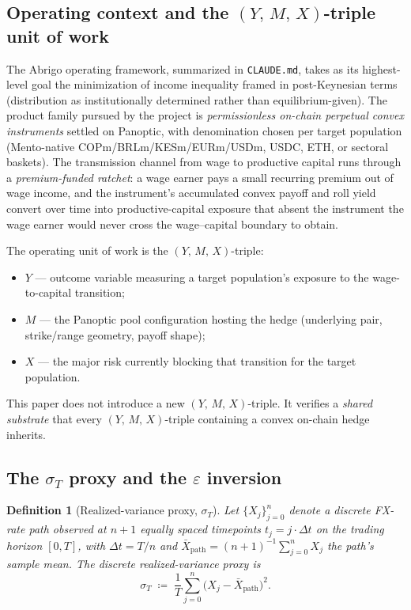 \documentclass[11pt,letterpaper]{article}
\newtheorem{definition}{Definition}[section]
\newcommand{\sigmaT}{\sigma_{T}}
\newcommand{\Ymx}{(Y,\,M,\,X)}
\begin{document}
\subsection{Operating context and the $\Ymx$-triple unit of work}
\label{sec:framework:ymx}

The Abrigo operating framework, summarized in \texttt{CLAUDE.md}, takes as
its highest-level goal the minimization of income inequality framed in
post-Keynesian terms (distribution as institutionally determined rather
than equilibrium-given). The product family pursued by the project is
\emph{permissionless on-chain perpetual convex instruments} settled on
Panoptic, with denomination chosen per target population (Mento-native
\textsf{COPm}/\textsf{BRLm}/\textsf{KESm}/\textsf{EURm}/\textsf{USDm},
USDC, ETH, or sectoral baskets). The transmission channel from wage to
productive capital runs through a \emph{premium-funded ratchet}: a wage
earner pays a small recurring premium out of wage income, and the
instrument's accumulated convex payoff and roll yield convert over time
into productive-capital exposure that absent the instrument the wage
earner would never cross the wage--capital boundary to obtain.

The operating unit of work is the \(\Ymx\)-triple:
\begin{itemize}
    \item $Y$ — outcome variable measuring a target population's exposure
        to the wage-to-capital transition;
    \item $M$ — the Panoptic pool configuration hosting the hedge
        (underlying pair, strike/range geometry, payoff shape);
    \item $X$ — the major risk currently blocking that transition for
        the target population.
\end{itemize}

This paper does not introduce a new \(\Ymx\)-triple. It verifies a
\emph{shared substrate} that every \(\Ymx\)-triple containing a convex
on-chain hedge inherits.

\subsection{The $\sigmaT$ proxy and the $\varepsilon$ inversion}
\label{sec:framework:sigmaT}

\begin{definition}[Realized-variance proxy, $\sigmaT$]
\label{def:sigmaT}
Let $\{X_j\}_{j=0}^{n}$ denote a discrete FX-rate path observed at
$n+1$ equally spaced timepoints $t_j = j \cdot \Delta t$ on the
trading horizon $[0, T]$, with $\Delta t = T/n$ and
$\bar{X}_{\text{path}} = (n+1)^{-1}\sum_{j=0}^{n} X_j$ the path's
sample mean. The discrete realized-variance proxy is
\begin{equation}
    \sigmaT \;\coloneqq\; \frac{1}{T}\sum_{j=0}^{n}
    \bigl(X_j - \bar{X}_{\text{path}}\bigr)^{2}.
    \label{eq:sigmaT}
\end{equation}
\end{definition}
\end{document}

